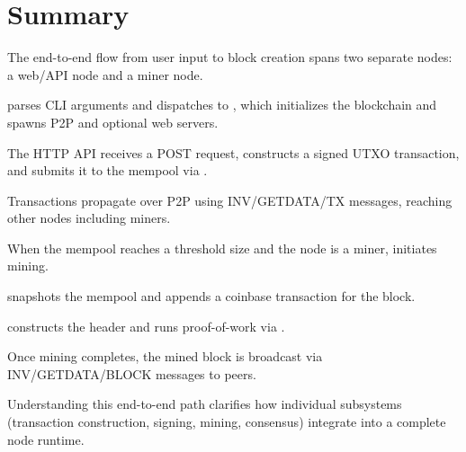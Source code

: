 \section{Summary}
\label{sec:ch09-9-summary}

\begin{chaptersummary}
  \item The end-to-end flow from user input to block creation spans two separate nodes: a web/API node and a miner node.
  \item {} parses CLI arguments and dispatches to , which initializes the blockchain and spawns P2P and optional web servers.
  \item The HTTP API receives a POST request, constructs a signed UTXO transaction, and submits it to the mempool via .
  \item Transactions propagate over P2P using INV/GETDATA/TX messages, reaching other nodes including miners.
  \item When the mempool reaches a threshold size and the node is a miner,  initiates mining.
  \item {} snapshots the mempool and appends a coinbase transaction for the block.
  \item {} constructs the header and runs proof-of-work via .
  \item Once mining completes, the mined block is broadcast via INV/GETDATA/BLOCK messages to peers.
  \item Understanding this end-to-end path clarifies how individual subsystems (transaction construction, signing, mining, consensus) integrate into a complete node runtime.
\end{chaptersummary}
